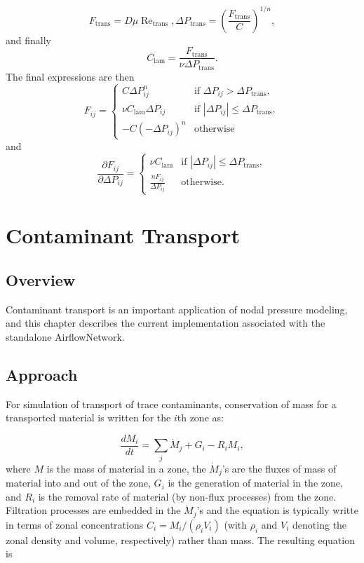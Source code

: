 \documentclass[10pt]{report}
\DeclareMathOperator{\reynum}{Re}
\begin{document}
\begin{equation}
F_\text{trans}=D\mu\reynum_\text{trans}, 
\Delta P_\text{trans} = \left(\frac{F_\text{trans}}{C}\right)^{1/n},
\end{equation}
and finally
\begin{equation}
C_\text{lam} = \frac{F_\text{trans}}{\nu\Delta P_\text{trans}}.
\end{equation}
The final expressions are then
\begin{equation}\label{finalMassPowerLaw}
F_{ij} = \begin{cases}
  C\Delta P_{ij}^n &\text{if $\Delta P_{ij} > \Delta P_\text{trans}$},\\
  \nu C_\text{lam}\Delta P_{ij} &\text{if $|\Delta P_{ij}| 
    \le \Delta P_\text{trans}$},\\
  -C(-\Delta P_{ij})^n &\text{otherwise}
\end{cases}
\end{equation}
and
\begin{equation}
\frac{\partial F_{ij}}{\partial \Delta P_{ij}} = \begin{cases}
  \nu C_\text{lam} &\text{if $|\Delta P_{ij}| 
	\le \Delta P_\text{trans}$},\\
  \frac{nF_{ij}}{\Delta P_{ij}} &\text{otherwise}.
\end{cases}
\end{equation}

\chapter{Contaminant Transport}
\section{Overview}
Contaminant transport is an important application of nodal pressure modeling, and this
chapter describes the current implementation associated with the standalone
AirflowNetwork.
\section{Approach}
For simulation of transport of trace contaminants, conservation of mass for a
transported material is written for the $i$th zone as:

\begin{equation}
\frac{dM_i}{dt} = \sum_j{\dot{M}_j} + G_i - R_i M_i,
\end{equation}
\noindent
where $M$ is the mass of material in a zone, the $\dot{M}_j$'s are the fluxes of mass
of material into and out of the zone, $G_i$ is the generation of material in the
zone, and $R_i$ is the removal rate of material (by non-flux processes) from the
zone. Filtration processes are embedded in the $\dot{M}_j$'s and the equation is
typically writte in terms of zonal concentrations $C_i = M_i/(\rho_i V_i)$ (with $\rho_i$
and $V_i$ denoting the zonal density and volume, respectively) rather than mass. The
resulting equation is
\end{document}
